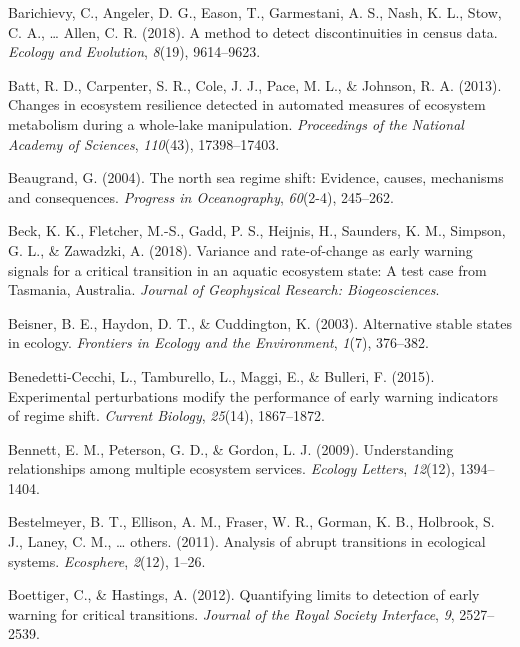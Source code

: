 \documentclass[12pt,twoside,openany]{reedthesis}
\begin{document}
\leavevmode\hypertarget{ref-barichievy2018method}{}%
Barichievy, C., Angeler, D. G., Eason, T., Garmestani, A. S., Nash, K. L., Stow, C. A., \ldots{} Allen, C. R. (2018). A method to detect discontinuities in census data. \emph{Ecology and Evolution}, \emph{8}(19), 9614--9623.

\leavevmode\hypertarget{ref-batt2013changes}{}%
Batt, R. D., Carpenter, S. R., Cole, J. J., Pace, M. L., \& Johnson, R. A. (2013). Changes in ecosystem resilience detected in automated measures of ecosystem metabolism during a whole-lake manipulation. \emph{Proceedings of the National Academy of Sciences}, \emph{110}(43), 17398--17403.

\leavevmode\hypertarget{ref-beaugrand2004north}{}%
Beaugrand, G. (2004). The north sea regime shift: Evidence, causes, mechanisms and consequences. \emph{Progress in Oceanography}, \emph{60}(2-4), 245--262.

\leavevmode\hypertarget{ref-beck_variance_2018}{}%
Beck, K. K., Fletcher, M.-S., Gadd, P. S., Heijnis, H., Saunders, K. M., Simpson, G. L., \& Zawadzki, A. (2018). Variance and rate-of-change as early warning signals for a critical transition in an aquatic ecosystem state: A test case from Tasmania, Australia. \emph{Journal of Geophysical Research: Biogeosciences}.

\leavevmode\hypertarget{ref-beisner2003alternative}{}%
Beisner, B. E., Haydon, D. T., \& Cuddington, K. (2003). Alternative stable states in ecology. \emph{Frontiers in Ecology and the Environment}, \emph{1}(7), 376--382.

\leavevmode\hypertarget{ref-benedetti2015experimental}{}%
Benedetti-Cecchi, L., Tamburello, L., Maggi, E., \& Bulleri, F. (2015). Experimental perturbations modify the performance of early warning indicators of regime shift. \emph{Current Biology}, \emph{25}(14), 1867--1872.

\leavevmode\hypertarget{ref-bennett2009understanding}{}%
Bennett, E. M., Peterson, G. D., \& Gordon, L. J. (2009). Understanding relationships among multiple ecosystem services. \emph{Ecology Letters}, \emph{12}(12), 1394--1404.

\leavevmode\hypertarget{ref-bestelmeyer_analysis_2011}{}%
Bestelmeyer, B. T., Ellison, A. M., Fraser, W. R., Gorman, K. B., Holbrook, S. J., Laney, C. M., \ldots{} others. (2011). Analysis of abrupt transitions in ecological systems. \emph{Ecosphere}, \emph{2}(12), 1--26.

\leavevmode\hypertarget{ref-boettiger_quantifying_2012}{}%
Boettiger, C., \& Hastings, A. (2012). Quantifying limits to detection of early warning for critical transitions. \emph{Journal of the Royal Society Interface}, \emph{9}, 2527--2539.
\end{document}

